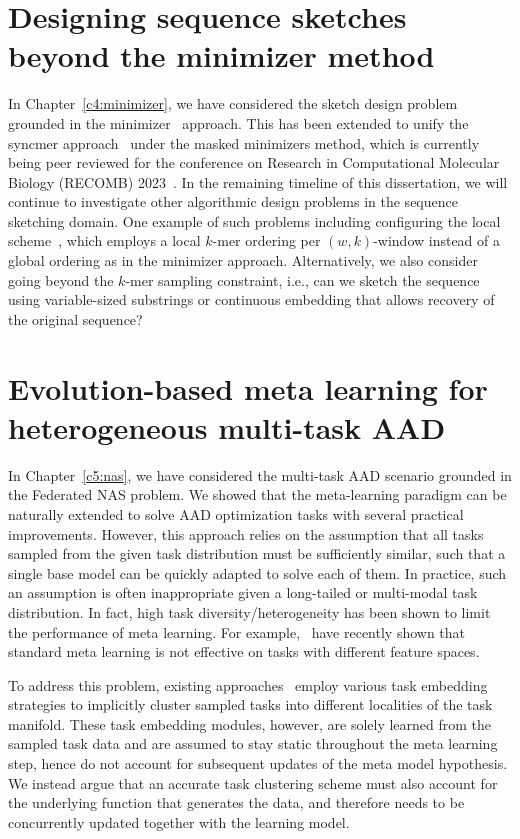 \section{Designing sequence sketches beyond the minimizer method}
In Chapter~\ref{c4:minimizer}, we have considered the sketch design problem grounded in the minimizer~\citep{schleimer03,marcais17} approach. This has been extended to unify the syncmer approach~\citep{edgar2021syncmers,shaw2021theory} under the masked minimizers method, which is currently being peer reviewed for the conference on Research in Computational Molecular Biology (RECOMB) 2023~\cite{hoang2022masked}. In the remaining timeline of this dissertation, we will continue to investigate other algorithmic design problems in the sequence sketching domain. One example of such problems including configuring the local scheme~\cite{marcais18}, which employs a local $k$-mer ordering per $(w,k)$-window instead of a global ordering as in the minimizer approach. Alternatively, we also consider going beyond the $k$-mer sampling constraint, i.e., can we sketch the sequence using variable-sized substrings or continuous embedding that allows recovery of the original sequence?

\section{Evolution-based meta learning for heterogeneous multi-task AAD}
\label{c5:future}
In Chapter~\ref{c5:nas}, we have considered the multi-task AAD scenario grounded in the Federated NAS problem. We showed that the meta-learning paradigm can be naturally extended to solve AAD optimization tasks with several practical improvements. However, this approach relies on the assumption that all tasks sampled from the given task distribution must be sufficiently similar, such that a single base model can be quickly adapted to solve each of them. In practice, such an assumption is often inappropriate given a long-tailed or multi-modal task distribution. In fact, high task diversity/heterogeneity has been shown to limit the performance of meta learning. For example, \citet{chen2021hetmaml,iwata2020meta}~have recently shown that standard meta learning is not effective on tasks with different feature spaces.

To address this problem, existing approaches~\cite{chen2021hetmaml,iwata2020meta} employ various task embedding strategies to implicitly cluster sampled tasks into different localities of the task manifold. These task embedding modules, however, are solely learned from the sampled task data and are assumed to stay static throughout the meta learning step, hence do not account for subsequent updates of the meta model hypothesis. We instead argue that an accurate task clustering scheme must also account for the underlying function that generates the data, and therefore needs to be concurrently updated together with the learning model.

